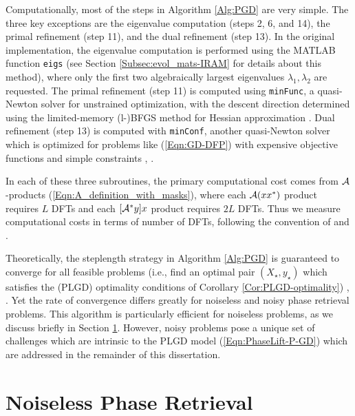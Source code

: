 Computationally, most of the steps in Algorithm \ref{Alg:PGD} are very simple.  
The three key exceptions are the eigenvalue computation (steps 2, 6, and 14), the primal refinement (step 11), and the dual refinement (step 13).  
In the original implementation, the eigenvalue computation is performed using the MATLAB function \texttt{eigs} (see Section \ref{Subsec:evol_mats-IRAM} for details about this method), where only the first two algebraically largest eigenvalues $\lambda_1, \lambda_2$ are requested.  
The primal refinement (step 11) is computed using \texttt{minFunc}, a quasi-Newton solver for unstrained optimization, with the descent direction determined using the limited-memory (l-)BFGS method for Hessian approximation \cite{schmidt2005minFunc}.  
Dual refinement (step 13) is computed with \texttt{minConf}, another quasi-Newton solver which is optimized for problems like (\ref{Eqn:GD-DFP}) with expensive objective functions and simple constraints \cite{schmidt2008minConf}, \cite{schmidt2009optimizing}.

In each of these three subroutines, the primary computational cost comes from ${\mathcal A}$-products (\ref{Eqn:A_definition_with_masks}), where each ${\mathcal A}(xx^*)$ product requires $L$ DFTs and each $[{\mathcal A}^*y]x$ product requires $2L$ DFTs.  Thus we measure computational costs in terms of number of DFTs, following the convention of \cite{DBLP:journals/tit/CandesLS15} and \cite{DBLP:journals/siamsc/FriedlanderM16}.





Theoretically, the steplength strategy in Algorithm \ref{Alg:PGD} is guaranteed to converge for all feasible problems (i.e., find an optimal pair $(X_\star, y_\star)$ which satisfies the (PLGD) optimality conditions of Corollary \ref{Cor:PLGD-optimality}) \cite{zhang2004nonmonotone}, \cite[Proposition 1.2.3 and Section 3.3.1]{bertsekas2016nonlinear}.  Yet the rate of convergence differs greatly for noiseless and noisy phase retrieval problems.  This algorithm is particularly efficient for noiseless problems, as we discuss briefly in Section \ref{Subsec:PLGD_algo-noiseless_success}.  However, noisy problems pose a unique set of challenges which are intrinsic to the PLGD model (\ref{Eqn:PhaseLift-P-GD}) which are addressed in the remainder of this dissertation.










\section{Noiseless Phase Retrieval} 		\label{Subsec:PLGD_algo-noiseless_success}





